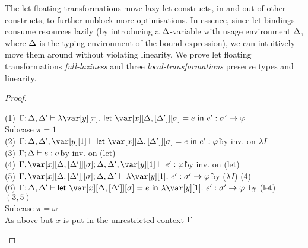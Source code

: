 



The let floating transformations move lazy let constructs, in and out of other
constructs, to further unblock more optimisations.
%
In essence, since let bindings consume resources lazily (by introducing a
$\Delta$-variable with usage environment $\Delta$, where $\Delta$ is the typing environment
of the bound expression), we can intuitively move them around without violating linearity.
%
We prove let floating transformations \emph{full-laziness} and three
\emph{local-transformations} preserve types and linearity.

\FullLazinessTheorem

\begin{proof}~

\begin{tabbing}
    (1) $\G; \D,\D' \vdash \lambda \y[\pi].~\llet{\xD = e}{e'} : \s' \to \vp$\\
    Subcase $\pi = 1$\\
    (2) $\G; \D,\D',\y[1] \vdash \llet{\xD = e}{e'} : \vp$\`by inv. on $\lambda I$\\
    (3) $\Gamma; \Delta \vdash e : \sigma$\` by inv. on (let)\\
    (4) $\G, \xD; \D, \D', \y[1] \vdash e' : \vp$\`by inv. on (let)\\
    (5) $\G, \xD; \D, \D' \vdash \lambda \y[1].~e' : \s' \to \vp$\`by ($\lambda I$) (4)\\
    (6) $\G; \D,\D' \vdash \llet{\xD = e}{\lambda \y[1].~e'} : \s' \to \vp$ by (let) $(3,5)$\\
    Subcase $\pi = \omega$\\
    As above but $x$ is put in the unrestricted context $\Gamma$
\end{tabbing}
\end{proof}


\LocalTransformationsTheorem

